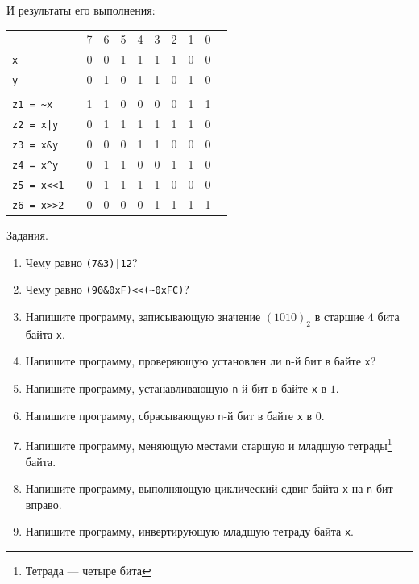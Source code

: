 \begin{enumerate}
    И результаты его выполнения:
    \begin{center}
        \begin{tabular}{lcccccccccc}
                     &&\small{7}&\small{6}&\small{5}&\small{4}&\small{3}&\small{2}&\small{1}&\small{0}& \\ \cline{3-10}
            \verb"x"    &\multicolumn{1}{c|}{}  &0&0&1&1&1&1&0&0&\multicolumn{1}{|c}{}\\ \cline{3-10}
            \verb"y"    &\multicolumn{1}{c|}{}  &0&1&0&1&1&0&1&0&\multicolumn{1}{|c}{}\\ \cline{3-10}
            \\ \cline{3-10}
            \verb"z1 = ~x"   &\multicolumn{1}{c|}{}  &1&1&0&0&0&0&1&1&\multicolumn{1}{|c}{}\\ \cline{3-10}
            \verb"z2 = x|y"  &\multicolumn{1}{c|}{}  &0&1&1&1&1&1&1&0&\multicolumn{1}{|c}{}\\ \cline{3-10}
            \verb"z3 = x&y"  &\multicolumn{1}{c|}{}  &0&0&0&1&1&0&0&0&\multicolumn{1}{|c}{}\\ \cline{3-10}
            \verb"z4 = x^y"  &\multicolumn{1}{c|}{}  &0&1&1&0&0&1&1&0&\multicolumn{1}{|c}{}\\ \cline{3-10}
            \verb"z5 = x<<1" &\multicolumn{1}{c|}{}  &0&1&1&1&1&0&0&0&\multicolumn{1}{|c}{}\\ \cline{3-10}
            \verb"z6 = x>>2" &\multicolumn{1}{c|}{}  &0&0&0&0&1&1&1&1&\multicolumn{1}{|c}{}\\ \cline{3-10}
        \end{tabular}
    \end{center}
    
    Задания.
    \begin{enumerate}
        \item Чему равно \verb"(7&3)|12"?
        \item Чему равно \verb"(90&0xF)<<(~0xFC)"?
        \item Напишите программу, записывающую значение $(1010)_2$ в старшие $4$ бита байта \verb"x".
        \item Напишите программу, проверяющую установлен ли \verb"n"-й бит в байте \verb"x"?
        \item Напишите программу, устанавливающую \verb"n"-й бит в байте \verb"x" в $1$.
        \item Напишите программу, сбрасывающую \verb"n"-й бит в байте \verb"x" в $0$.
        \item Напишите программу, меняющую местами старшую и младшую тетрады\footnote{Тетрада --- четыре бита} байта.
        \item Напишите программу, выполняющую циклический сдвиг байта \verb"x" на \verb"n" бит вправо.
        \item Напишите программу, инвертирующую младшую тетраду байта \verb"x".
    \end{enumerate}
\end{enumerate}


